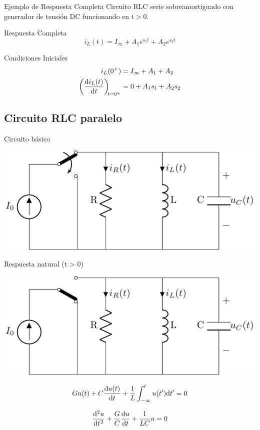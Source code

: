 \documentclass[aspectratio=169, usenames,svgnames,dvipsnames]{beamer}
\begin{document}
\begin{frame}[label={sec:org4585334}]{Ejemplo de Respuesta Completa}
Circuito RLC serie sobreamortiguado con generador de tensión DC funcionando en \(t > 0\). 

\begin{block}{Respuesta Completa}
\[
  i_L(t) = I_{\infty} + A_1 e^{s_1 t} + A_2 e^{s_2 t}
\]
\end{block}

\begin{block}{Condiciones Iniciales}
\begin{align*}
i_L(0^+) &= I_\infty + A_1 + A_2\\
\diff{i_L(t)}{t}[t = 0^+] &= 0 + A_1 s_1 + A_2 s_2
\end{align*}
\end{block}
\end{frame}


\subsection{Circuito RLC paralelo}
\label{sec:org21f6d6c}
\begin{frame}[label={sec:org35b8c85}]{Circuito básico}
\begin{center}
\includegraphics[width=.9\linewidth]{../figs/transitorio_circuitoRLC_paralelo.pdf}
\end{center}
\end{frame}

\begin{frame}[label={sec:org1d68ace}]{Respuesta natural (t > 0)}
\begin{center}
\includegraphics[height=0.45\textheight]{../figs/transitorio_circuitoRLC_paralelo_t0+.pdf}
\end{center}

\[
  Gu(t) + C\diff{u(t)}{t} + \frac{1}{L}\int_{-\infty}^t u(t') \mathrm{d}t' = 0
\]

\[
  \diff[2]{u}{t} + \frac{G}{C} \diff{u}{t} + \frac{1}{LC} u = 0
\]
\end{frame}
\end{document}
